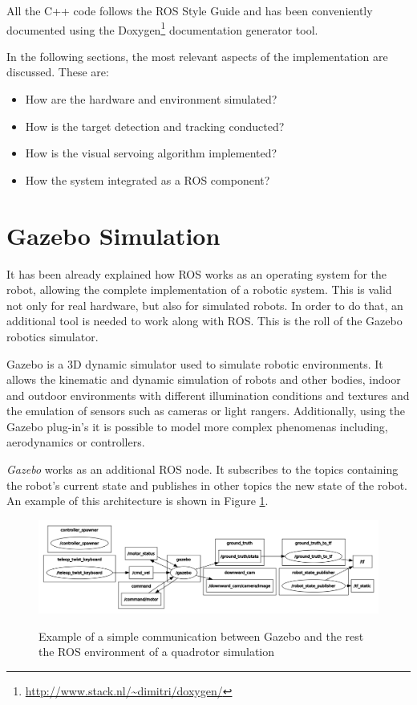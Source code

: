 All the C++ code follows the ROS Style Guide \cite{ROS_Style} and has been conveniently documented using the Doxygen\footnote{\url{http://www.stack.nl/~dimitri/doxygen/}} documentation generator tool.

In the following sections, the most relevant aspects of the implementation are discussed. These are: 

\begin{itemize}
	\item How are the hardware and environment simulated?
	
	\item How is the target detection and tracking conducted?
	
	\item How is the visual servoing algorithm implemented?
	
	\item How the system integrated as a ROS component?
\end{itemize}


\section{Gazebo Simulation}
\label{sec:gazebo-simulation}

It has been already explained how ROS works as an operating system for the robot, allowing the complete implementation of a robotic system. This is valid not only for real hardware, but also for simulated robots. In order to do that, an additional tool is needed to work along with ROS. This is the roll of the Gazebo robotics simulator.

Gazebo is a 3D dynamic simulator used to simulate robotic environments. It allows the kinematic and dynamic simulation of robots and other bodies, indoor and outdoor environments with different illumination conditions and textures and the emulation of sensors such as cameras or light rangers. Additionally, using the Gazebo plug-in's it is possible to model more complex phenomenas including, aerodynamics or controllers.

\emph{Gazebo} works as an additional ROS node. It subscribes to the topics containing the robot's current state and publishes in other topics the new state of the robot. An example of this architecture is shown in Figure \ref{fig:gazebo_example}.

\begin{figure}[!htb]
	\caption{Example of a simple communication between Gazebo and the rest the ROS environment of a quadrotor simulation}
	\centering
	\includegraphics[width=\textwidth]{content/chapter_05/images/gazebo_example.png}
	\label{fig:gazebo_example}
\end{figure}

